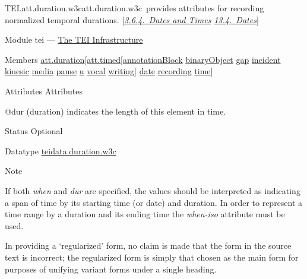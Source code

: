 \begin{reflist}
\item[]\begin{specHead}{TEI.att.duration.w3c}{att.duration.w3c} provides attributes for recording normalized temporal durations. [\textit{\hyperref[CONADA]{3.6.4.\ Dates and Times}} \textit{\hyperref[NDDATE]{13.4.\ Dates}}]\end{specHead} 
    \item[{Module}]
  tei — \hyperref[ST]{The TEI Infrastructure}
    \item[{Members}]
  \hyperref[TEI.att.duration]{att.duration}[\hyperref[TEI.att.timed]{att.timed}[\hyperref[TEI.annotationBlock]{annotationBlock} \hyperref[TEI.binaryObject]{binaryObject} \hyperref[TEI.gap]{gap} \hyperref[TEI.incident]{incident} \hyperref[TEI.kinesic]{kinesic} \hyperref[TEI.media]{media} \hyperref[TEI.pause]{pause} \hyperref[TEI.u]{u} \hyperref[TEI.vocal]{vocal} \hyperref[TEI.writing]{writing}] \hyperref[TEI.date]{date} \hyperref[TEI.recording]{recording} \hyperref[TEI.time]{time}]
    \item[{Attributes}]
  Attributes\hfil\\[-10pt]\begin{sansreflist}
    \item[@dur]
  (duration) indicates the length of this element in time.
\begin{reflist}
    \item[{Status}]
  Optional
    \item[{Datatype}]
  \hyperref[TEI.teidata.duration.w3c]{teidata.duration.w3c}
\end{reflist}  
\end{sansreflist}  
    \item[{Note}]
  \par
If both {\itshape when} and {\itshape dur} are specified, the values should be interpreted as indicating a span of time by its starting time (or date) and duration. In order to represent a time range by a duration and its ending time the {\itshape when-iso} attribute must be used.\par
In providing a ‘regularized’ form, no claim is made that the form in the source text is incorrect; the regularized form is simply that chosen as the main form for purposes of unifying variant forms under a single heading.
\end{reflist}  

